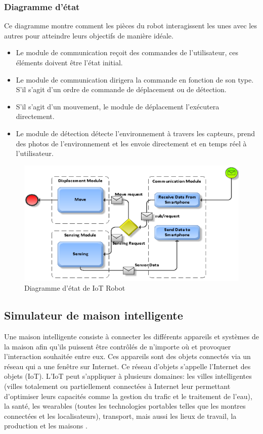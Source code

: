 \subsubsection{Diagramme d'état}
Ce diagramme montre comment les pièces du robot interagissent les unes avec les autres pour atteindre leurs objectifs de manière idéale.

\begin{itemize}
    \item Le module de communication reçoit des commandes de l'utilisateur, ces éléments doivent être l'état initial.
    \item Le module de communication dirigera la commande en fonction de son type. S'il s'agit d'un ordre de commande de déplacement ou de détection.
    \item S'il s'agit d'un mouvement, le module de déplacement l'exécutera directement. 
    \item Le module de détection détecte l'environnement à travers les capteurs, prend des photos de l'environnement et les envoie directement et en temps réel à l'utilisateur.
\end{itemize}
\begin{figure}[H]
\centering
\includegraphics[scale=0.8]{chap1/fc14.png}
\caption{Diagramme d'état de IoT Robot}
\label{fc14}
\end{figure}
\subsection{Simulateur de maison intelligente}
Une maison intelligente consiste à connecter les différents appareils et systèmes de la maison afin qu'ils puissent être contrôlés de n'importe où et provoquer l'interaction souhaitée entre eux. Ces appareils sont des objets connectés via un réseau qui a une fenêtre sur Internet. Ce réseau d'objets s'appelle l'Internet des objets (IoT). L'IoT peut s'appliquer à plusieurs domaines: les villes intelligentes (villes totalement ou partiellement connectées à Internet leur permettant d'optimiser leurs capacités comme la gestion du trafic et le traitement de l'eau), la santé, les wearables (toutes les technologies portables telles que les montres connectées et les localisateurs), transport, mais aussi les lieux de travail, la production et les maisons \cite{zouai2017smart}.
